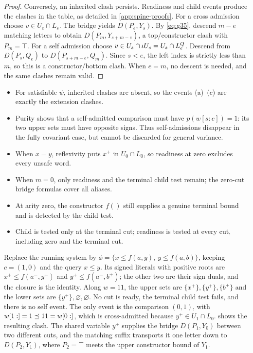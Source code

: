\begin{proof}
Conversely, an inherited clash persists. Readiness and child events
produce the clashes in the table, as detailed in \cref{app:spine-proofs}.
For a cross admission choose $v\in U_e\cap L_s$. The bridge yields
$D(P_e,Y_s)$. By \eqref{eq:g35}, descend $m-e$ matching letters to obtain
$D(P_m,Y_{s+m-e})$, a top/constructor clash with $P_m=\top$. For a self admission
choose $v\in U_s\cap\iota U_e=U_s\cap L^Q_e$. Descend from
$D(P_s,Q_e)$ to $D(P_{s+m-e},Q_m)$. Since $s<e$, the left index
is strictly less than $m$, so this is a constructor/bottom clash.
When $e=m$, no descent is needed, and the same clashes remain valid. \end{proof}

\begin{remark}\label{rem:clash-cases}
\leavevmode
\begin{itemize}[leftmargin=*]
\item For satisfiable $\psi$, inherited clashes are absent, so the events
  (a)--(c) are exactly the extension clashes.
\item Purity shows that a self-admitted comparison must have
  $p(w[s:e])=1$: its two upper sets must have opposite signs. Thus
  self-admissions disappear in the fully covariant case, but cannot be
  discarded for general variance.
\item When $x=y$, reflexivity puts $x^+$ in $U_0\cap L_0$, so readiness at
  zero excludes every unsafe word.
\item When $m=0$, only readiness and the terminal child test remain; the
  zero-cut bridge formulas cover all aliases.
\item At arity zero, the constructor $f()$ still supplies a genuine
  terminal bound and is detected by the child test.
\item Child is tested only at the terminal cut; readiness is tested at
  every cut, including zero and the terminal cut.
\end{itemize}
\end{remark}

\begin{example}\label{ex:cross-event}
Replace the running system by $\phi=\{x\le f(a,y),\ y\le f(a,b)\}$,
keeping $c=(1,0)$ and the query $x\le y$. Its signed literals with positive
roots are $x^+\le f(a^-,y^+)$ and $y^+\le f(a^-,b^+)$; the other two are
their sign duals, and the closure is the identity. Along $w=11$, the upper sets are $\{x^+\},\{y^+\},\{b^+\}$ and
the lower sets are $\{y^+\},\varnothing,\varnothing$. No cut is ready, the
terminal child test fails, and there is no self event. The only event is
the comparison $(0,1)$, with $w[1:]=1\preceq11=w[0:]$, which is cross-admitted
because $y^+\in U_1\cap L_0$.  shows the resulting
clash. The shared variable $y^+$ supplies the bridge $D(P_1,Y_0)$ between
two different cuts, and the matching suffix transports it one letter down
to $D(P_2,Y_1)$, where $P_2=\top$ meets the upper constructor bound of $Y_1$.
\end{example}


